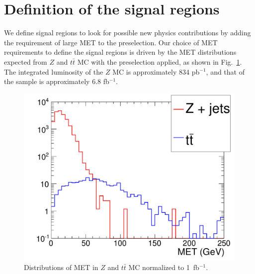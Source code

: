 \section{Definition of the signal regions}
\label{sec:sigregion}

We define signal regions to look for possible
new physics contributions by adding the requirement of large MET to the preselection. 
Our choice of MET requirements to define the signal regions is driven by the 
MET distributions expected from $Z$ and $t\bar{t}$ MC with the preselection applied, 
as shown in Fig.~\ref{fig:metdist}. The integrated luminosity of the $Z$ MC is 
approximately 834 pb$^{-1}$, and that of the \ttbar sample is approximately 6.8 fb$^{-1}$.

\begin{figure}[tbh]
\begin{center}
\includegraphics[width=0.75\linewidth]{plots/met_ttbar_Z.pdf}
\caption{\label{fig:metdist}\protect Distributions of MET in $Z$ and $t\bar{t}$ MC normalized to 1~fb$^{-1}$.}
\end{center}
\end{figure}

